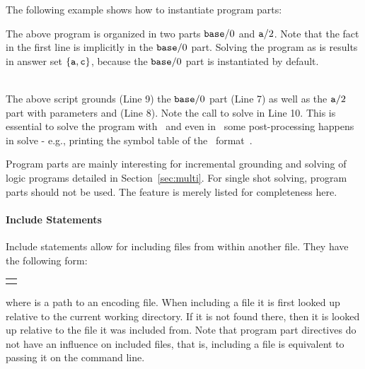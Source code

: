 \begin{example}
The following example shows how to instantiate program parts:

The above program is organized in two parts $\texttt{base}/0$ and $\texttt{a}/2$.
Note that the fact in the first line is implicitly in the $\texttt{base}/0$ part.
Solving the program as is results in answer set $\{\texttt{a}, \texttt{c}\}$,
because the $\texttt{base}/0$ part is instantiated by default.
\\[-8pt] %
\begin{minipage}[t]{0.51\textwidth}

\end{minipage}
\begin{minipage}[t]{0.51\textwidth}

\end{minipage}\\
%
%
%
The above script grounds (Line 9) the $\texttt{base}/0$ part (Line 7) as well as the $\texttt{a}/2$ part with parameters  and  (Line 8).
Note the call to solve in Line 10.
This is essential to solve the program with \clingo\
and even in \gringo\ some post-processing happens in solve - e.g.,
printing the symbol table of the \smodels\ format~\cite{lparseManual}.
\eexample
\end{example}

\begin{note}
Program parts are mainly interesting for incremental grounding and solving of logic programs detailed in Section~\ref{sec:multi}.
For single shot solving, program parts should not be used.
The feature is merely listed for completeness here.
\end{note}

\paragraph{Include Statements}
Include statements allow for including files from within another file.
They have the following form:
%
\par
\medskip
\begin{tabular}{l}
\code{\#include~"{\itshape file}".}
\end{tabular}
\par
\medskip
\noindent
%
where  is a path to an encoding file.
When including a file it is first looked up relative to the current working directory.
If it is not found there, then it is looked up relative to the file it was included from.
Note that program part directives do not have an influence on included files,
that is, including a file is equivalent to passing it on the command line.

